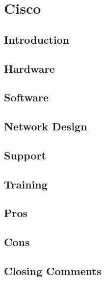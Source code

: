 \section{Cisco}

\subsection{Introduction}
\subsection{Hardware}
\subsection{Software}
\subsection{Network Design}
\subsection{Support}
\subsection{Training}
\subsection{Pros}
\subsection{Cons}
\subsection{Closing Comments}
